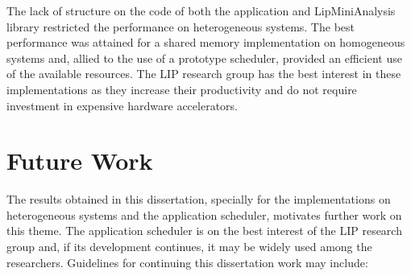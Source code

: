 The lack of structure on the code of both the application and LipMiniAnalysis library restricted the performance on heterogeneous systems. The best performance was attained for a shared memory implementation on homogeneous systems and, allied to the use of a prototype scheduler, provided an efficient use of the available resources. The LIP research group has the best interest in these implementations as they increase their productivity and do not require investment in expensive hardware accelerators.

\section{Future Work}
\label{FutureWork}

The results obtained in this dissertation, specially for the implementations on heterogeneous systems and the application scheduler, motivates further work on this theme. The application scheduler is on the best interest of the LIP research group and, if its development continues, it may be widely used among the researchers. Guidelines for continuing this dissertation work may include:

